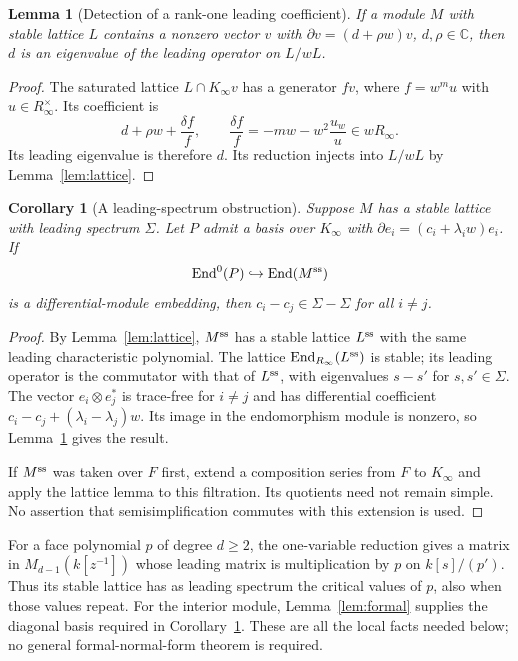 \documentclass[11pt]{article}
\numberwithin{equation}{section}
\newtheorem{lemma}[lemma]{Lemma}
\newtheorem{corollary}[corollary]{Corollary}
\theoremstyle{definition}
\theoremstyle{remark}
\newcommand{\C}{\mathbb C}
\newcommand{\End}{\operatorname{End}}
\begin{document}
\begin{lemma}[Detection of a rank-one leading coefficient]\label{lem:rankone}
If a module $M$ with stable lattice $L$ contains a nonzero vector $v$ with
$\partial v=(d+\rho w)v$, $d,\rho\in\C$, then $d$ is an eigenvalue of the
leading operator on $L/wL$.
\end{lemma}
\begin{proof}
The saturated lattice $L\cap K_\infty v$ has a generator $fv$, where
$f=w^m u$ with $u\in R_\infty^\times$. Its coefficient is
\[
 d+\rho w+\frac{\delta f}{f},\qquad
 \frac{\delta f}{f}=-mw-w^2\frac{u_w}{u}\in wR_\infty.
\]
Its leading eigenvalue is therefore $d$. Its reduction injects into $L/wL$
by Lemma~\ref{lem:lattice}.
\end{proof}

\begin{corollary}[A leading-spectrum obstruction]\label{cor:face-lattice}
Suppose $M$ has a stable lattice with leading spectrum $\Sigma$. Let $P$
admit a basis over $K_\infty$ with
$\partial e_i=(c_i+\lambda_iw)e_i$. If
\[
 \End^0(P)\hookrightarrow\End(M^{\rm ss})
\]
is a differential-module embedding, then $c_i-c_j\in\Sigma-\Sigma$ for
all $i\ne j$.
\end{corollary}
\begin{proof}
By Lemma~\ref{lem:lattice}, $M^{\rm ss}$ has a stable lattice $L^{\rm ss}$
with the same leading characteristic polynomial. The lattice
$\End_{R_\infty}(L^{\rm ss})$ is stable; its leading operator is the
commutator with that of $L^{\rm ss}$, with eigenvalues $s-s'$ for
$s,s'\in\Sigma$. The vector $e_i\otimes e_j^*$ is trace-free for $i\ne j$
and has differential coefficient
$c_i-c_j+(\lambda_i-\lambda_j)w$. Its image in the endomorphism module is
nonzero, so Lemma~\ref{lem:rankone} gives the result.

If $M^{\rm ss}$ was taken over $F$ first, extend a composition series from
$F$ to $K_\infty$ and apply the lattice lemma to this filtration. Its
quotients need not remain simple. No assertion that semisimplification
commutes with this extension is used.
\end{proof}

For a face polynomial $p$ of degree $d\ge2$, the one-variable reduction gives
a matrix in $M_{d-1}(k[z^{-1}])$ whose leading matrix is multiplication by
$p$ on $k[s]/(p')$. Thus its stable lattice has as leading spectrum the
critical values of $p$, also when those values repeat. For the interior
module, Lemma~\ref{lem:formal} supplies the diagonal basis required in
Corollary~\ref{cor:face-lattice}. These are all the local facts needed below;
no general formal-normal-form theorem is required.
\end{document}
